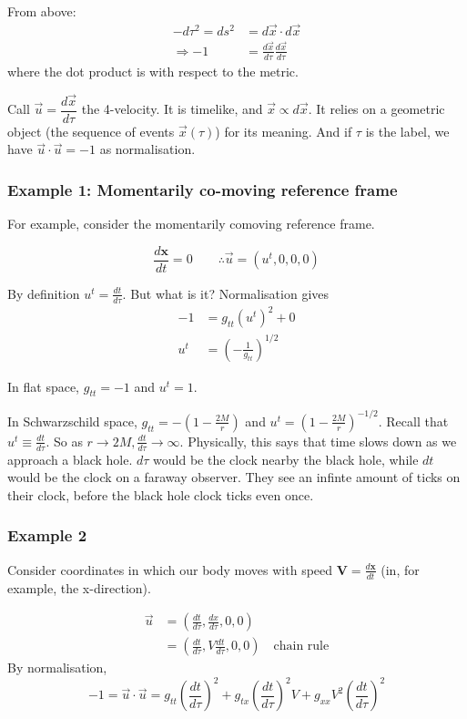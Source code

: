 \documentclass[a4paper]{article} %
\newcommand{\vect}[1]{\mathbf{#1}} %
\begin{document}
From above:
\begin{align*}
-d\tau^2=ds^2&=d\vec{x}\cdot d\vec{x}\\
\Rightarrow -1&=\frac{d\vec{x}}{d\tau}\frac{d\vec{x}}{d\tau}
\end{align*}
where the dot product is with respect to the metric. 

Call $\vec{u}=\dfrac{d\vec{x}}{d\tau}$ the 4-velocity. It is timelike, and $\vec{x}\propto d\vec{x}$. It relies on a geometric object (the sequence of events $\vec{x}(\tau)$) for its meaning. And if $\tau$ is the label, we have $\vec{u}\cdot \vec{u}=-1$ as normalisation.

\subsubsection{Example 1: Momentarily co-moving reference frame}
For example, consider the momentarily comoving reference frame.

\begin{equation}
\frac{d\mathbf{x}}{dt}=0 \qquad \therefore \vec{u}=(u^t,0,0,0)
\end{equation}

By definition $u^t=\frac{dt}{d\tau}$. But what is it? Normalisation gives
\begin{align*}
-1&=g_{tt}(u^t)^2+0\\
u^t&=\left(-\frac{1}{g_{tt}}\right)^{1/2}
\end{align*}

In flat space, $g_{tt}=-1$ and $u^t=1$.

In Schwarzschild space, $g_{tt}=-\left(1-\frac{2M}{r}\right)$ and $u^t=\left(1-\frac{2M}{r}\right)^{-1/2}$. Recall that $u^t \equiv \frac{dt}{d\tau}$. So as $r\to 2M, \frac{dt}{d\tau}\to \infty$. Physically, this says that time slows down as we approach a black hole. $d\tau$ would be the clock nearby the black hole, while $dt$ would be the clock on a faraway observer. They see an infinte amount of ticks on their clock, before the black hole clock ticks even once.

\subsubsection{Example 2}
Consider coordinates in which our body moves with speed $\vect{V}=\frac{d\vect{x}}{dt}$ (in, for example, the x-direction).

\begin{align*}
\vec{u}&=\left(\frac{dt}{d\tau},\frac{dx}{d\tau},0,0 \right)\\
&=\left(\frac{dt}{d\tau}, V\frac{dt}{d\tau},0,0\right) \quad \text{chain rule}
\end{align*}
By normalisation,
\begin{equation}
-1=\vec{u}\cdot\vec{u}=g_{tt}\left(\frac{dt}{d\tau}\right)^2+g_{tx}\left(\frac{dt}{d\tau}\right)^2 V+g_{xx}V^2\left(\frac{dt}{d\tau}\right)^2
\end{equation}
\end{document}
